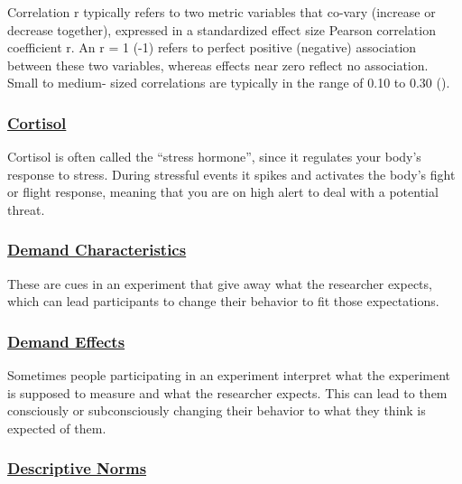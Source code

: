 \documentclass[
  letterpaper,
]{book}
\begin{document}
Correlation r typically refers to two metric variables that co-vary
(increase or decrease together), expressed in a standardized effect size
Pearson correlation coefficient r. An r = 1 (-1) refers to perfect
positive (negative) association between these two variables, whereas
effects near zero reflect no association. Small to medium- sized
correlations are typically in the range of 0.10 to 0.30
().

\subsubsection*{\texorpdfstring{\hyperref[def-cortisol]{Cortisol}}{Cortisol}}\label{cortisol}

Cortisol is often called the ``stress hormone'', since it regulates your
body's response to stress. During stressful events it spikes and
activates the body's fight or flight response, meaning that you are on
high alert to deal with a potential threat.

\subsubsection*{\texorpdfstring{\hyperref[def-demandcharacteristics]{Demand
Characteristics}}{Demand Characteristics}}\label{demand-characteristics}

These are cues in an experiment that give away what the researcher
expects, which can lead participants to change their behavior to fit
those expectations.

\subsubsection*{\texorpdfstring{\hyperref[def-demandeffects]{Demand
Effects}}{Demand Effects}}\label{demand-effects}

Sometimes people participating in an experiment interpret what the
experiment is supposed to measure and what the researcher expects. This
can lead to them consciously or subconsciously changing their behavior
to what they think is expected of them.

\subsubsection*{\texorpdfstring{\hyperref[def-descriptivenorms]{Descriptive
Norms}}{Descriptive Norms}}\label{descriptive-norms}
\end{document}
